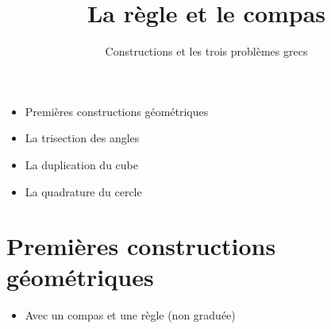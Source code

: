 


\newcommand{\construc}{\mathcal{C}}
\newcommand{\plan}{\mathcal{P}}
\newcommand{\cercle}{\mathcal{C}}






\title{{\bf La règle et le compas}}
\subtitle{Constructions et les trois problèmes grecs}

\begin{frame}
  
  \debutmontitre

  \pause

{\footnotesize
\hfill
{}
\begin{minipage}{0.6\textwidth}
  \begin{itemize}
    \item<3-> Premières constructions géométriques
    \item<4-> La trisection des angles
    \item<5-> La duplication du cube
    \item<6-> La quadrature du cercle
  \end{itemize}
\end{minipage}
}

\end{frame}

\setcounter{framenumber}{0}


\section{Premières constructions géométriques}

\begin{frame}

\begin{itemize} 
  \item Avec un compas et une règle (non graduée)
  
\end{itemize} 
\vspace*{-5ex}
\end{frame}


